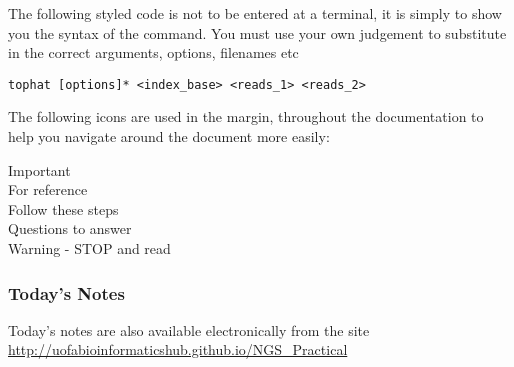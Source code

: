 The following styled code is not to be entered at a terminal, it is simply to show you the syntax of
the command. You must use your own judgement to substitute in the correct arguments, options,
filenames etc

\begin{lstlisting}[style=command_syntax]
tophat [options]* <index_base> <reads_1> <reads_2>
\end{lstlisting}

The following icons are used in the margin, throughout the documentation to help you navigate around
the document more easily:

\hspace*{.2cm} Important\\
\hspace*{.2cm} For reference\\
\hspace*{.2cm} Follow these steps\\
\hspace*{.2cm} Questions to answer\\
\hspace*{.2cm} Warning - STOP and read\\

\subsubsection*{Today's Notes}
Today's notes are also available electronically from the site \url{http://uofabioinformaticshub.github.io/NGS\_Practical}